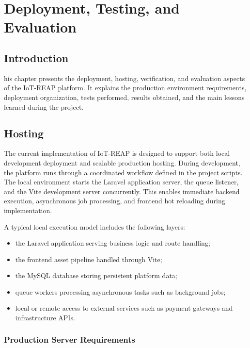 \chapter{Deployment, Testing, and Evaluation}
\setcounter{section}{0}

\section*{Introduction}

his chapter presents the deployment, hosting, verification, and evaluation aspects of the IoT-REAP platform. It explains the production environment requirements, deployment organization, tests performed, results obtained, and the main lessons learned during the project.

\section{Hosting}

The current implementation of IoT-REAP is designed to support both local development deployment and scalable production hosting. During development, the platform runs through a coordinated workflow defined in the project scripts. The local environment starts the Laravel application server, the queue listener, and the Vite development server concurrently. This enables immediate backend execution, asynchronous job processing, and frontend hot reloading during implementation.

A typical local execution model includes the following layers:

\begin{itemize}
\item the Laravel application serving business logic and route handling;
\item the frontend asset pipeline handled through Vite;
\item the MySQL database storing persistent platform data;
\item queue workers processing asynchronous tasks such as background jobs;
\item local or remote access to external services such as payment gateways and infrastructure APIs.
\end{itemize}

\subsection{Production Server Requirements}

